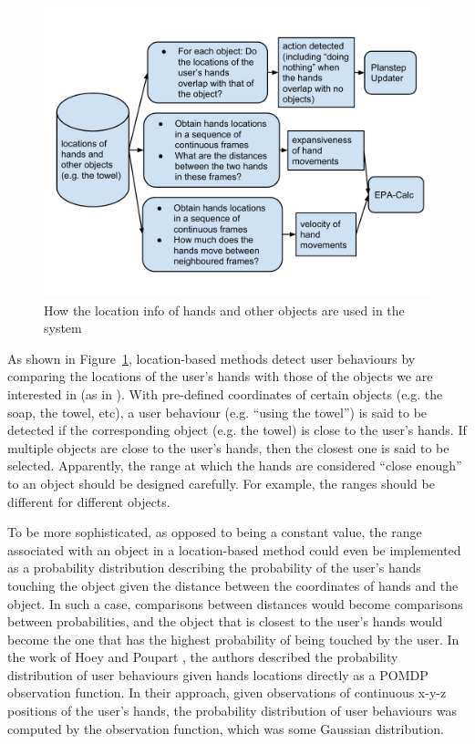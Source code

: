 \begin{figure}[htp]
\centering
\includegraphics[trim = 4mm 13mm 2mm 14mm, clip, width=0.9\linewidth]{fig/fig-location-use.pdf}
\caption{How the location info of hands and other objects are used in the system}
\label{fig:location-use}
\end{figure}

As shown in Figure~\ref{fig:location-use}, location-based methods detect user behaviours by comparing the locations of the user's hands with those of the objects we are interested in (as in \cite{boger2005decision, czarnuch2014}). With pre-defined coordinates of certain objects (e.g. the soap, the towel, etc), a user behaviour (e.g. ``using the towel'') is said to be detected if the corresponding object (e.g. the towel) is close to the user's hands. If multiple objects are close to the user's hands, then the closest one is said to be selected. Apparently, the range at which the hands are considered ``close enough'' to an object should be designed carefully. For example, the ranges should be different for different objects. 

To be more sophisticated, as opposed to being a constant value, the range associated with an object in a location-based method could even be implemented as a probability distribution describing the probability of the user's hands touching the object given the distance between the coordinates of hands and the object. In such a case, comparisons between distances would become comparisons between probabilities, and the object that is closest to the user's hands would become the one that has the highest probability of being touched by the user. In the work of Hoey and Poupart \cite{hoey2005solving}, the authors described the probability distribution of user behaviours given hands locations directly as a POMDP observation function. In their approach, given observations of continuous x-y-z positions of the user's hands, the probability distribution of user behaviours was computed by the observation function, which was some Gaussian distribution.

